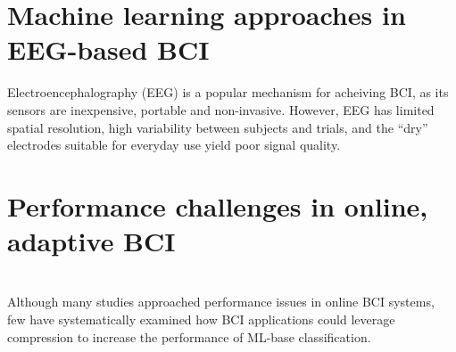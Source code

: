 
\section{Machine learning approaches in EEG-based BCI}
Electroencephalography (EEG) is a popular mechanism for acheiving BCI, as its sensors are inexpensive, portable and non-invasive. However, EEG has limited spatial resolution, high variability between subjects and trials, and the ``dry'' electrodes suitable for everyday use yield poor signal quality. 

\section{Performance challenges in online, adaptive BCI}

\section{}
Although many studies approached performance issues in online BCI systems,  few have systematically examined how BCI applications could leverage compression to increase the performance of ML-base classification.